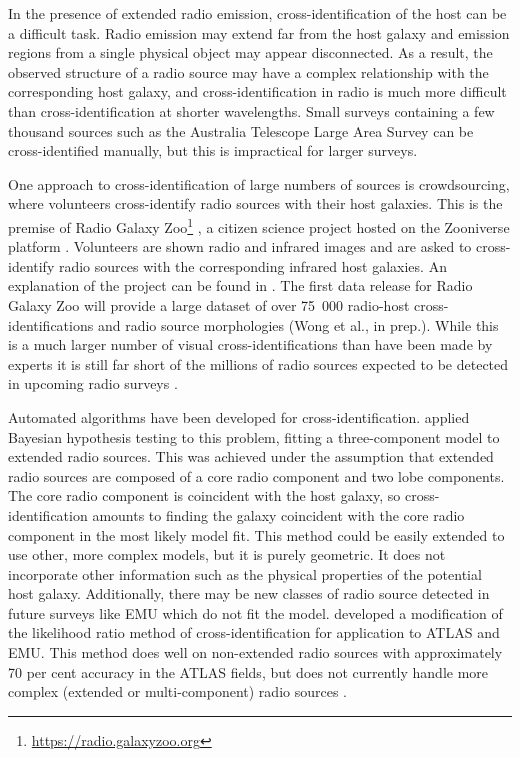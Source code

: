     In the presence of extended radio emission, cross-identification of the host can be a
    difficult task. {Radio emission may extend far from the host galaxy
    and emission regions from a single physical object may appear disconnected. As a result, the
    observed structure of a radio source may have a complex relationship
    with the corresponding host galaxy, and cross-identification in radio is
    much more difficult than cross-identification at shorter wavelengths.} Small surveys
    containing a few thousand sources such as the Australia Telescope Large Area Survey
    \citep[ATLAS;][]{norris06, middelberg08} can be cross-identified manually,
    but this is impractical for larger surveys.

    One approach to cross-identification of large numbers of sources is crowdsourcing, where volunteers
    cross-identify radio sources with their host galaxies. This is the premise of Radio Galaxy
    Zoo\footnote{\url{https://radio.galaxyzoo.org}} \citep{banfield15}, a
    citizen science project hosted on the Zooniverse platform \citep{lintott08}.
    Volunteers are shown radio and infrared images and are asked to
    cross-identify radio sources with the corresponding infrared host galaxies. An
    explanation of the project can be found in \citet{banfield15}. The first
    data release for Radio Galaxy Zoo will provide a large dataset of over
    75~000 radio-host cross-identifications and radio source morphologies
    (Wong et al., in prep.). While this is a much larger number of visual
    cross-identifications than have been made by experts \citep[e.g.,
    ][]{taylor2007,Gendre2008,grant2010,norris06,middelberg08} it is still far
    short of the millions of radio sources expected to be detected in upcoming
    radio surveys \citep{norris17surveys}.

    Automated algorithms have been developed for cross-identification.
    \citet{fan15} applied Bayesian
    hypothesis testing to this problem, fitting a three-component model to extended radio
    sources. This was achieved under the assumption that extended radio sources
    are composed of a core radio component and two lobe components. The core
    radio component is coincident with the host galaxy, so cross-identification
    amounts to finding the galaxy coincident with the core radio component in
    the most likely model fit. This method could be easily extended to use other, more
    complex models, but it is purely geometric. It does not incorporate
    other information such as the physical properties of the potential host
    galaxy. Additionally, there may be new classes of radio source detected in
    future surveys like EMU which do not fit the model. \citet{weston18lrpy}
    developed a modification of the likelihood ratio method of
    cross-identification \citep{richter75likelihood} for application to ATLAS
    and EMU. This method does well on non-extended radio sources
    with approximately 70 per cent accuracy in the ATLAS fields, but does
    not currently handle more complex (extended or multi-component) radio sources
    \citep{norris17unexpected}.

